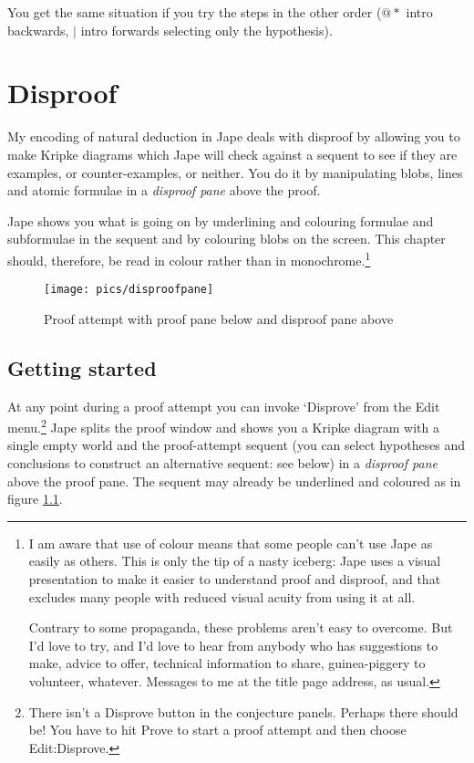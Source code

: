 \documentclass[11pt]{book}
\newcommand{\figref}[1]{figure \ref{fig:#1}}
\begin{document}
You get the same situation if you try the steps in the other order ($@*$ intro backwards, $|$ intro forwards selecting only the hypothesis).


\chapter{Disproof}
\label{chap:disproof}

My encoding of natural deduction in Jape deals with disproof by allowing you to make Kripke diagrams which Jape will check against a sequent to see if they are examples, or counter-examples, or neither. You do it by manipulating blobs, lines and atomic formulae in a \emph{disproof pane} above the proof.

Jape shows you what is going on by underlining and colouring formulae and subformulae in the sequent and by colouring blobs on the screen. This chapter should, therefore, be read in colour rather than in monochrome.\footnote{I am aware that use of colour means that some people can't use Jape as easily as others. This is only the tip of a nasty iceberg: Jape uses a visual presentation to make it easier to understand proof and disproof, and that excludes many people with reduced visual acuity from using it at all.

Contrary to some propaganda, these problems aren't easy to overcome. But I'd love to try, and I'd love to hear from anybody who has suggestions to make, advice to offer, technical information to share, guinea-piggery to volunteer, whatever. Messages to me at the title page address, as usual.}

\begin{figure}
\centering
\texttt{[image: pics/disproofpane]}
\caption{Proof attempt with proof pane below and disproof pane above}
\label{fig:disproofpane}
\end{figure}

\section{Getting started}

At any point during a proof attempt you can invoke `Disprove' from the Edit menu.\footnote{There isn't a Disprove button in the conjecture panels. Perhaps there should be! You have to hit Prove to start a proof attempt and then choose Edit:Disprove.} Jape splits the proof window and shows you a Kripke diagram with a single empty world and the proof-attempt sequent (you can select hypotheses and conclusions to construct an alternative sequent: see below) in a \emph{disproof pane} above the proof pane. The sequent may already be underlined and coloured as in \figref{disproofpane}.
\end{document}
